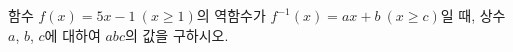 함수 $f(x)=5x-1\ (x\ge 1)$의 역함수가 $f^{-1}(x)=ax+b\ (x\ge c)$일 때, 상수 $a$, $b$, $c$에 대하여 $abc$의 값을 구하시오.
